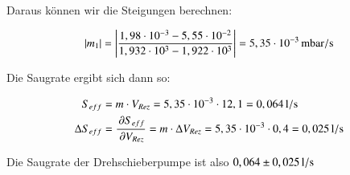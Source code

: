Daraus können wir die Steigungen berechnen:

\begin{align*}
|m_1| &= \left| \frac{1,98 \cdot 10^{-3} - 5,55 \cdot 10^{-2}}{1,932 \cdot 10^{3} - 1,922 \cdot 10^{3}} \right| = \unit[5,35 \cdot 10^{-3}]{mbar/s} \\
\end{align*}

Die Saugrate ergibt sich dann so:

\begin{align*}
S_{eff} &= m \cdot V_{Rez} = 5,35 \cdot 10^{-3} \cdot 12,1 = \unit[0,064]{l/s} \\
\Delta S_{eff} &= \frac{\p S_{eff}}{\p V_{Rez}} = m \cdot \Delta V_{Rez} = 5,35 \cdot 10^{-3} \cdot 0,4 = \unit[0,025]{l/s}
\end{align*}


Die Saugrate der Drehschieberpumpe ist also $\unit[0,064 \pm 0,025]{l/s}$













